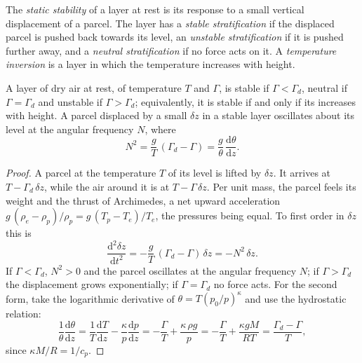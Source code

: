\begin{definition}\label{def:b1:fluid-envelopes-structure:stability}
The \emph{static stability} of a layer at rest is its
response to a small vertical displacement of a parcel. The layer has a
\emph{stable stratification} if the displaced
parcel is pushed back towards its level, an \emph{unstable
stratification} if it is pushed further away,
and a \emph{neutral stratification} if no force
acts on it. A \emph{temperature inversion} is a
layer in which the temperature increases with height.
\end{definition}

\begin{theorem}\label{thm:b1:fluid-envelopes-structure:stability}
A layer of dry air at rest, of temperature $T$ and 
$\Gamma$, is stable if $\Gamma < \Gamma_d$, neutral if $\Gamma = \Gamma_d$ and
unstable if $\Gamma > \Gamma_d$; equivalently, it is stable if and only if its
 increases with height. A parcel displaced by a small
$\delta z$ in a stable layer oscillates about its level at the
angular frequency $N$, where
\[
  N^2 = \frac{g}{T}\,(\Gamma_d - \Gamma) = \frac{g}{\theta}\,\frac{\mathrm d\theta}{\mathrm dz}.
\]
\end{theorem}

\begin{proof}
A parcel at the temperature $T$ of its level is lifted by $\delta z$. It arrives
at $T - \Gamma_d\,\delta z$, while the air around it is at $T - \Gamma\,\delta z$.
Per unit mass, the parcel feels its weight and the thrust of Archimedes, a net
upward acceleration $g\,(\rho_e - \rho_p)/\rho_p = g\,(T_p - T_e)/T_e$, the
pressures being equal. To first order in $\delta z$ this is
\[
  \frac{\mathrm d^2 \delta z}{\mathrm dt^2} = -\frac{g}{T}\,(\Gamma_d - \Gamma)\,\delta z = -N^2\,\delta z .
\]
If $\Gamma < \Gamma_d$, $N^2 > 0$ and the parcel oscillates at the angular
frequency $N$; if $\Gamma > \Gamma_d$ the displacement grows exponentially; if
$\Gamma = \Gamma_d$ no force acts. For the second form, take the logarithmic
derivative of $\theta = T (p_0/p)^{\kappa}$ and use the hydrostatic relation:
\[
  \frac{1}{\theta}\frac{\mathrm d\theta}{\mathrm dz} = \frac{1}{T}\frac{\mathrm dT}{\mathrm dz}
  - \frac{\kappa}{p}\frac{\mathrm dp}{\mathrm dz} = -\frac{\Gamma}{T} + \frac{\kappa\,\rho g}{p}
  = -\frac{\Gamma}{T} + \frac{\kappa g M}{RT} = \frac{\Gamma_d - \Gamma}{T},
\]
since $\kappa M/R = 1/c_p$.
\end{proof}

